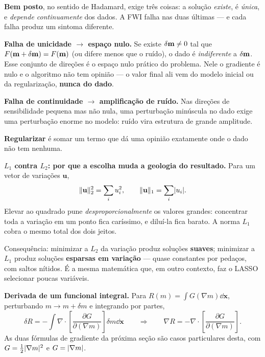 \documentclass[11pt,a4paper,oneside]{report}
\begin{document}
\begin{matematica}
\textbf{Bem posto}, no sentido de Hadamard, exige tr\^es coisas: a
solu\c{c}\~ao \emph{existe}, \'e \emph{\'unica}, e \emph{depende continuamente}
dos dados. A FWI falha nas duas \'ultimas --- e cada falha produz um sintoma
diferente.

\textbf{Falha de unicidade $\to$ espa\c{c}o nulo.} Se existe
$\delta\mathbf{m} \ne 0$ tal que $F(\mathbf{m}+\delta\mathbf{m}) = F(\mathbf{m})$ (ou difere menos
que o ru\'ido), o dado \'e \emph{indiferente} a $\delta\mathbf{m}$. Esse conjunto de
dire\c{c}\~oes \'e o espa\c{c}o nulo pr\'atico do problema. Nele o gradiente
\'e nulo e o algoritmo n\~ao tem opini\~ao --- o valor final ali vem do modelo
inicial ou da regulariza\c{c}\~ao, \textbf{nunca do dado}.

\textbf{Falha de continuidade $\to$ amplifica\c{c}\~ao de ru\'ido.} Nas
dire\c{c}\~oes de sensibilidade pequena mas n\~ao nula, uma perturba\c{c}\~ao
min\'uscula no dado exige uma perturba\c{c}\~ao enorme no modelo: ru\'ido vira
estrutura de grande amplitude.

\textbf{Regularizar} \'e somar um termo que d\'a uma opini\~ao exatamente onde
o dado n\~ao tem nenhuma.

\medskip
\textbf{$L_1$ contra $L_2$: por que a escolha muda a geologia do resultado.}
Para um vetor de varia\c{c}\~oes $\mathbf{u}$,
\[
\lVert \mathbf{u} \rVert_2^{2} = \sum_i u_i^{2},
\qquad
\lVert \mathbf{u} \rVert_1 = \sum_i \lvert u_i \rvert .
\]
Elevar ao quadrado pune \emph{desproporcionalmente} os valores grandes:
concentrar toda a varia\c{c}\~ao em um ponto fica car\'issimo, e dilu\'i-la
fica barato. A norma $L_1$ cobra o mesmo total dos dois jeitos.

Consequ\^encia: minimizar a $L_2$ da varia\c{c}\~ao produz solu\c{c}\~oes
\textbf{suaves}; minimizar a $L_1$ produz solu\c{c}\~oes \textbf{esparsas em
varia\c{c}\~ao} --- quase constantes por peda\c{c}os, com saltos n\'itidos.
\'E a mesma matem\'atica que, em outro contexto, faz o LASSO selecionar
poucas vari\'aveis.

\textbf{Derivada de um funcional integral.} Para
$R(m) = \int G(\nabla m)\dd\mathbf{x}$, perturbando $m \to m+\delta m$ e
integrando por partes,
\[
\delta R = -\int \nabla\!\cdot\!\left[
  \frac{\partial G}{\partial(\nabla m)}\right]\delta m\dd\mathbf{x}
\qquad\Longrightarrow\qquad
\nabla R = -\nabla\!\cdot\!\left[\frac{\partial G}{\partial(\nabla m)}\right].
\]
As duas f\'ormulas de gradiente da pr\'oxima se\c{c}\~ao s\~ao casos
particulares desta, com $G = \tfrac12\lvert \nabla m \rvert^{2}$ e
$G = \lvert \nabla m \rvert$.
\end{matematica}
\end{document}
